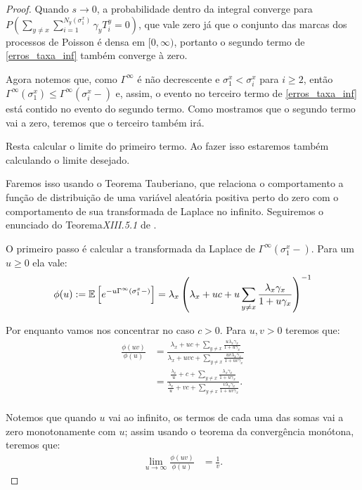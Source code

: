 \begin{proof}
  Quando $s \to 0$, a probabilidade dentro da integral converge para
  $P \left( \sum_{y \neq x} \sum_{i = 1}^{N_y (\sigma^x_1)} \gamma_y
    T^y_i = 0 \right)$, que vale zero já que o conjunto das marcas dos
  processos de Poisson é densa em $[0, \infty)$, portanto o segundo
  termo de \eqref{erros_taxa_inf} também converge à zero.


  Agora notemos que, como $\Gamma^\infty$ é não decrescente e $\sigma^x_1
  < \sigma^x_i$ para $i \geq 2$, então $\Gamma^\infty(\sigma^x_1) \leq
  \Gamma^\infty(\sigma^x_i -)$ e, assim, o evento no terceiro termo de
  \eqref{erros_taxa_inf} está contido no evento do segundo
  termo. Como mostramos que o segundo termo vai a zero, teremos
  que o terceiro também irá.

  Resta calcular o limite do primeiro termo. Ao fazer isso
  estaremos também calculando o limite desejado.

  Faremos isso usando o Teorema Tauberiano, que relaciona o
  comportamento a função de distribuição de uma variável aleatória
  positiva perto do zero com o comportamento de sua transformada de
  Laplace no infinito.  Seguiremos o enunciado do
  Teorema\emph{XIII.5.1} de \cite{fellerv2}.

  O primeiro passo é calcular a transformada da Laplace de
  $\Gamma^\infty(\sigma^x_1-)$. Para um $u \geq 0$ ela vale:
  \begin{align*}
    \phi (u) := {\mathbb{E}} \left[ e^{-u \Gamma^\infty (\sigma^x_1-)}  \right] =
    \lambda_x \left( \lambda_x + uc + u \sum_{y \neq x}
      \frac{\lambda_x \gamma_x}{1 + u\gamma_x}  \right)^{-1}
  \end{align*}

  Por enquanto vamos nos concentrar no caso $c > 0$. Para $u, v > 0$
  teremos que:
  \begin{align*}
    \frac{\phi(uv)}{\phi (u)} &= \frac{\lambda_x + uc + \sum_{y \neq
        x} \frac{u \lambda_x\gamma_x}{1 + u \gamma_x}} {\lambda_x + u
      v c + \sum_{y \neq x} \frac{u v
        \lambda_x\gamma_x}{1 + u v \gamma_x}} \\
    &= \frac{\frac{\lambda_x}{u} + c + \sum_{y \neq x}
      \frac{\lambda_x\gamma_x}{1 + u \gamma_x}} {\frac{\lambda_x}{u} +
      v c + \sum_{y \neq x} \frac{v
        \lambda_x\gamma_x}{1 + u v \gamma_x}}. \\
  \end{align*}

  Notemos que quando $u$ vai ao infinito, os termos de cada uma das
  somas vai a zero monotonamente com $u$; assim usando o teorema da
  convergência monótona, teremos que:
  \begin{align*}
      \lim_{u \to \infty} \frac{\phi(uv)}{\phi (u)} &= \frac{1}{v}.
  \end{align*}


\end{proof}
